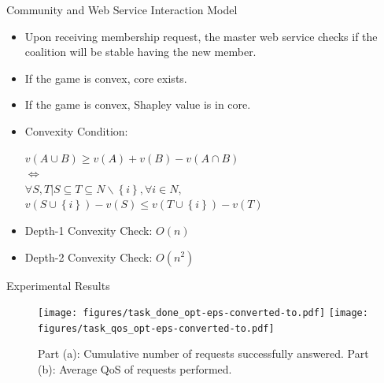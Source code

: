 \documentclass{beamer}
\begin{document}
\begin{frame}{Community and Web Service Interaction Model}


    \begin{itemize}
        \item Upon receiving membership request, the master web service checks if the coalition will be stable having the new member.
        \item If the game is convex, core exists.
        \item If the game is convex, Shapley value is in core.
        \item Convexity Condition:
        \begin{center}
          $v(A \cup B) \geq v(A) + v(B) - v(A \cap B)$ \\
          $\Leftrightarrow$  \\
          $\forall S,T | S \subseteq T \subseteq N \backslash \left\{i\right\}, \forall i \in N,$ \\
          {\color{blue} $v(S \cup \left\{i\right\}) - v(S) \leq v (T \cup \left\{i\right\}) - v(T)$ }
        \end{center}
        \item Depth-1 Convexity Check: $O(n)$
        \item Depth-2 Convexity Check: $O(n^2)$
    \end{itemize}
       	
\end{frame}







\begin{frame}{Experimental Results}

    \begin{figure}[!t]
    \centering
    \texttt{[image: figures/task\_done\_opt-eps-converted-to.pdf]}
    \texttt{[image: figures/task\_qos\_opt-eps-converted-to.pdf]}
    \caption{Part (a): Cumulative number of requests successfully
    answered. Part (b): Average QoS of requests performed.}
    \label{performanceall}
    \end{figure}

\end{frame}
\end{document}
